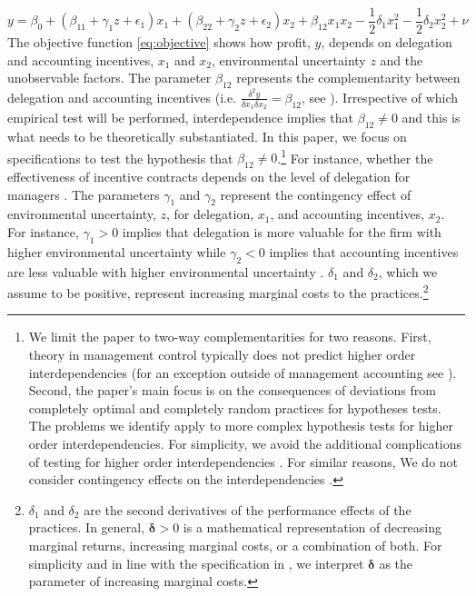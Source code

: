 \documentclass[12pt]{article}
\begin{document}
\begin{equation}\label{eq:objective}
y  = \beta_0 + (\beta_{11} + \gamma_1 z + \epsilon_1) x_1 
						+ (\beta_{22} + \gamma_2 z  + \epsilon_2) x_2 
                        + \beta_{12} x_1 x_2 - \frac{1}{2}\delta_1 x^2_1 - \frac{1}{2}\delta_2 x^2_2 + \nu
\end{equation}
The objective function \eqref{eq:objective} shows how profit, $y$, depends on delegation and accounting incentives, $x_1$ and $x_2$, environmental uncertainty $z$ and the unobservable factors. The parameter $\beta_{12}$ represents the complementarity between delegation and accounting incentives (i.e. $\frac{\delta^2 y}{\delta x_1 \delta x_2} = \beta_{12}$, see \citep{grabner_management_2013}). Irrespective of which empirical test will be performed, interdependence implies that $\beta_{12}\neq0$ and this is what needs to be theoretically substantiated. In this paper, we focus on specifications to test the hypothesis that $\beta_{12} \neq 0$.\footnote{We limit the paper to two-way complementarities for two reasons. First, theory in management control typically does not predict higher order interdependencies (for an exception outside of management accounting see \citet{aral_three-way_2012}). Second, the paper's main focus is on the consequences of deviations from completely optimal and completely random practices for hypotheses tests. The problems we identify apply to more complex hypothesis tests for higher order interdependencies. For simplicity, we avoid the additional complications of testing for higher order interdependencies \citep{carree_note_2011}. For similar reasons, We do not consider contingency effects on the interdependencies \citep{grabner_cost_2016, matejka_balancing_2017}.}
For instance, whether the effectiveness of incentive contracts depends on the level of delegation for managers \citep{moers_performance_2006, indjejikian_accounting_2012}. The parameters $\gamma_1$ and $\gamma_2$ represent the contingency effect of environmental uncertainty, $z$, for delegation, $x_1$, and accounting incentives, $x_2$. For instance, $\gamma_1 > 0$ implies that delegation is more valuable for the firm with higher environmental uncertainty while $\gamma_2 < 0$ implies that accounting incentives are less valuable with higher environmental uncertainty \citep{chenhall_management_2003}. 
$\delta_1$ and $\delta_2$, which we assume to be positive, represent increasing marginal costs to the practices.\footnote{$\delta_{1}$ and $\delta_{2}$ are the second derivatives of the performance effects of the practices. In general, $\mathbf{\delta} > 0$ is a mathematical representation of decreasing marginal returns,  increasing marginal  costs, or a combination of both. For simplicity and in line with the specification in \citet{grabner_management_2013}, we interpret $\mathbf{\delta}$ as the parameter of  increasing marginal costs.} 
\end{document}
